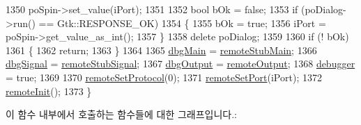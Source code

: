 \begin{DoxyCode}
1350   poSpin->set\_value(iPort);  
1351 
1352   \textcolor{keywordtype}{bool} bOk = \textcolor{keyword}{false};
1353   \textcolor{keywordflow}{if} (poDialog->run() == Gtk::RESPONSE\_OK)
1354   \{
1355     bOk = \textcolor{keyword}{true};
1356     iPort = poSpin->get\_value\_as\_int();
1357   \}
1358   \textcolor{keyword}{delete} poDialog;
1359 
1360   \textcolor{keywordflow}{if} (! bOk)
1361   \{
1362     \textcolor{keywordflow}{return};
1363   \}
1364 
1365   \mbox{\hyperlink{windowcallbacks_8cpp_a2a73601d4d24ff6d902f4e6b4c7b06fe}{dbgMain}}   = \mbox{\hyperlink{windowcallbacks_8cpp_a3fc86793182abde32b75da7885cb7337}{remoteStubMain}};
1366   \mbox{\hyperlink{windowcallbacks_8cpp_aaa0130c668d61033a5012af849b1fead}{dbgSignal}} = \mbox{\hyperlink{windowcallbacks_8cpp_a5309cd8c07c439a8edfa790743175a19}{remoteStubSignal}};
1367   \mbox{\hyperlink{windowcallbacks_8cpp_ae5aca87b107fd7cb9c29c6489cf438ac}{dbgOutput}} = \mbox{\hyperlink{windowcallbacks_8cpp_a2e3d3e94a2ed5eb4ad78a320f24ca743}{remoteOutput}};
1368   \mbox{\hyperlink{windowcallbacks_8cpp_af67e2df4c66ef114f4edb85c06810007}{debugger}}  = \textcolor{keyword}{true};
1369 
1370   \mbox{\hyperlink{windowcallbacks_8cpp_ae12004b9afc1b49d9f40d3efb5862c81}{remoteSetProtocol}}(0);
1371   \mbox{\hyperlink{windowcallbacks_8cpp_a0753bdc2e948e3b0bf452e8183c74dfd}{remoteSetPort}}(iPort);
1372   \mbox{\hyperlink{windowcallbacks_8cpp_a9f014181ce9f2daee148f90876f6b86a}{remoteInit}}();
1373 \}
\end{DoxyCode}
이 함수 내부에서 호출하는 함수들에 대한 그래프입니다.\+:
\nopagebreak
